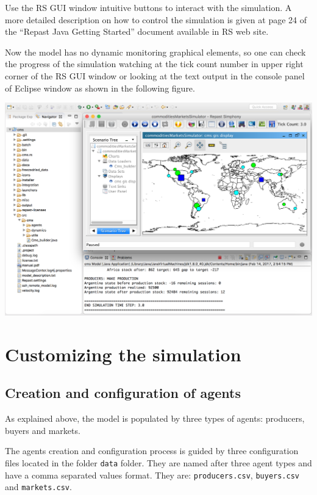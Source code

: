 \documentclass{article}
\begin{document}
Use the RS GUI window intuitive buttons to interact with the simulation. A more detailed description on how to control the simulation is given at page 24 of the ``Repast Java Getting Started'' document available in RS web site.

Now the model has no dynamic monitoring graphical elements, so one can check the progress of the simulation watching at the tick count number in upper right corner of the RS GUI window or looking at the text output in the console panel of Eclipse window as shown in the following figure. 

\vskip2mm
\noindent
\includegraphics[scale=0.35]{fig_cms_rs_gui7}

\vskip2mm





\section{Customizing the simulation}\label{sec:initialization}
\subsection{Creation and configuration of agents}

As explained above, the model is populated by three types of agents: producers, buyers and markets.

The agents creation and configuration process is guided by three configuration files located in the folder \verb+data+ folder.
They are named after three agent types and have a comma separated values format. They are: \verb+producers.csv+, \verb+buyers.csv+ and \verb+markets.csv+.
\end{document}
